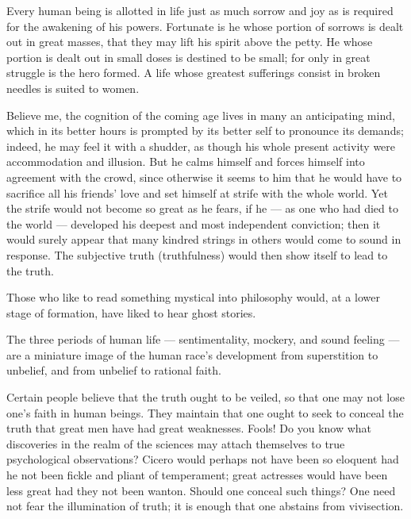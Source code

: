 \documentclass[12pt,a4paper]{article}
\newcommand{\opage}[1]{\marginnote{\footnotesize\textit{[#1]}}}
\newcommand{\aphsep}{\par\smallskip\centerline{\textasteriskcentered}\smallskip}
\begin{document}
\aphsep

Every human being is allotted in life just as much sorrow and joy as is required
for the awakening of his powers. Fortunate is he whose portion of sorrows is
dealt out in great masses, that they may lift his spirit above the petty. He
whose portion is dealt out in small doses is destined to be small; for only in
great struggle is the hero formed. A life whose greatest sufferings consist in
broken needles is suited to women.

\aphsep

Believe me, the cognition of the coming age lives in many an anticipating mind,
which in its better hours is prompted by its better self to pronounce its
demands; indeed, he may feel it with a shudder, as though his whole present
activity were accommodation and illusion. But he calms himself and forces himself
into agreement with the crowd, since otherwise it seems to him that he would have
to sacrifice all his friends' love and set himself at strife with the whole
world. Yet the strife would not become so great as he fears, if he --- as one who
had died to the world --- developed his deepest and most independent conviction;
then it would surely appear that many kindred strings in others would come to
sound in response. The subjective truth (truthfulness) would then show itself to
lead to the truth.

\aphsep

Those who like to read something mystical into philosophy would, at a lower stage
of formation, have liked to hear ghost stories.

\opage{31}The three periods of human life --- sentimentality, mockery, and sound
feeling --- are a miniature image of the human race's development from
superstition to unbelief, and from unbelief to rational faith.

\aphsep

Certain people believe that the truth ought to be veiled, so that one may not
lose one's faith in human beings. They maintain that one ought to seek to conceal
the truth that great men have had great weaknesses. Fools! Do you know what
discoveries in the realm of the sciences may attach themselves to true
psychological observations? Cicero would perhaps not have been so eloquent had he
not been fickle and pliant of temperament; great actresses would have been less
great had they not been wanton. Should one conceal such things? One need not fear
the illumination of truth; it is enough that one abstains from vivisection.
\end{document}

